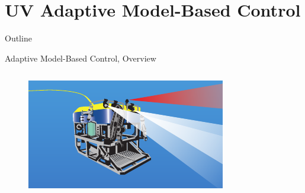 \section{UV Adaptive Model-Based Control}


\begin{frame}{Outline}

  \tableofcontents

\end{frame}


\begin{frame}[t]{Adaptive Model-Based Control, Overview}%
   \begin{columns}
    \begin{center}
      \begin{figure}[htbp]
        \begin{center}
          \includegraphics[width=\textwidth]{./pres/images/justJason}
        \end{center}
      \end{figure}
    \end{center}


\end{columns}
\end{frame}
